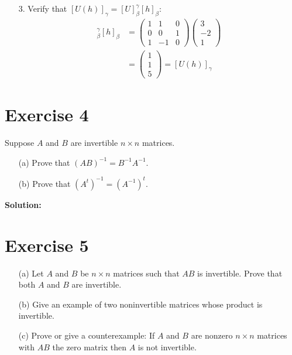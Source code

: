 \documentclass{article}
\begin{document}
\begin{enumerate}
\begin{enumerate}
\begin{enumerate}
\item[3.] Verify that $[U(h)]_{\gamma} = [U]_{\beta}^{\gamma}[h]_{\beta}$:
\begin{align*}
[U]_{\beta}^{\gamma}[h]_{\beta} &= 
\begin{pmatrix}
1 & 1 & 0 \\
0 & 0 & 1 \\
1 & -1 & 0
\end{pmatrix}
\begin{pmatrix}
3 \\
-2 \\
1
\end{pmatrix} \\
&= 
\begin{pmatrix}
1 \\
1 \\
5
\end{pmatrix} = [U(h)]_{\gamma}
\end{align*}
\end{enumerate}
\end{enumerate}
\end{enumerate}

\newpage

\section*{Exercise 4}
Suppose $A$ and $B$ are invertible $n \times n$ matrices.

\begin{enumerate}
\item[(a)] Prove that $(AB)^{-1} = B^{-1}A^{-1}$.
\item[(b)] Prove that $(A^t)^{-1} = (A^{-1})^t$.
\end{enumerate}

\textbf{Solution: } \\



\newpage

\section*{Exercise 5}
\begin{enumerate}
\item[(a)] Let $A$ and $B$ be $n \times n$ matrices such that $AB$ is invertible. Prove that both $A$ and $B$ are invertible.
\item[(b)] Give an example of two noninvertible matrices whose product is invertible.
\item[(c)] Prove or give a counterexample: If $A$ and $B$ are nonzero $n \times n$ matrices with $AB$ the zero matrix then $A$ is not invertible.
\end{enumerate}
\end{document}
